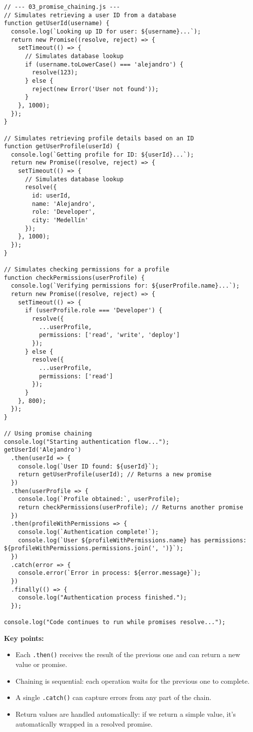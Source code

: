 \documentclass[12pt,letterpaper]{article}
\newenvironment{macterminal}{%
    \begin{mdframed}[
        linecolor=terminalFrame,
        backgroundcolor=terminalBg,
        roundcorner=5pt,
        skipabove=5pt,
        skipbelow=5pt,
        linewidth=1pt,
        innertopmargin=5pt,
        frametitle={%
            \tikz[baseline=(current bounding box.east), outer sep=0pt]{
                \fill[red!80!black] (0,0) circle (5pt);
                \fill[yellow!80!black] (0.7,0) circle (5pt);
                \fill[green!70!black] (1.4,0) circle (5pt);
            }
        },
        frametitlealignment=\raggedright,
        frametitleaboveskip=8pt,
        frametitlebelowskip=0pt,
    ]
}{%
    \end{mdframed}%
}
\begin{document}
\begin{macterminal}
\begin{lstlisting}
// --- 03_promise_chaining.js ---
// Simulates retrieving a user ID from a database
function getUserId(username) {
  console.log(`Looking up ID for user: ${username}...`);
  return new Promise((resolve, reject) => {
    setTimeout(() => {
      // Simulates database lookup
      if (username.toLowerCase() === 'alejandro') {
        resolve(123);
      } else {
        reject(new Error('User not found'));
      }
    }, 1000);
  });
}

// Simulates retrieving profile details based on an ID
function getUserProfile(userId) {
  console.log(`Getting profile for ID: ${userId}...`);
  return new Promise((resolve, reject) => {
    setTimeout(() => {
      // Simulates database lookup
      resolve({
        id: userId,
        name: 'Alejandro',
        role: 'Developer',
        city: 'Medellín'
      });
    }, 1000);
  });
}

// Simulates checking permissions for a profile
function checkPermissions(userProfile) {
  console.log(`Verifying permissions for: ${userProfile.name}...`);
  return new Promise((resolve, reject) => {
    setTimeout(() => {
      if (userProfile.role === 'Developer') {
        resolve({
          ...userProfile,
          permissions: ['read', 'write', 'deploy']
        });
      } else {
        resolve({
          ...userProfile,
          permissions: ['read']
        });
      }
    }, 800);
  });
}

// Using promise chaining
console.log("Starting authentication flow...");
getUserId('Alejandro')
  .then(userId => {
    console.log(`User ID found: ${userId}`);
    return getUserProfile(userId); // Returns a new promise
  })
  .then(userProfile => {
    console.log(`Profile obtained:`, userProfile);
    return checkPermissions(userProfile); // Returns another promise
  })
  .then(profileWithPermissions => {
    console.log(`Authentication complete!`);
    console.log(`User ${profileWithPermissions.name} has permissions: ${profileWithPermissions.permissions.join(', ')}`);
  })
  .catch(error => {
    console.error(`Error in process: ${error.message}`);
  })
  .finally(() => {
    console.log("Authentication process finished.");
  });

console.log("Code continues to run while promises resolve...");
\end{lstlisting}
\end{macterminal}

\textbf{Key points:}
\begin{itemize}
    \item Each \texttt{\textcolor{accentColor}{.then()}} receives the result of the previous one and can return a new value or promise.
    \item Chaining is sequential: each operation waits for the previous one to complete.
    \item A single \texttt{\textcolor{accentColor}{.catch()}} can capture errors from any part of the chain.
    \item Return values are handled automatically: if we return a simple value, it's automatically wrapped in a resolved promise.
\end{itemize}
\end{document}
